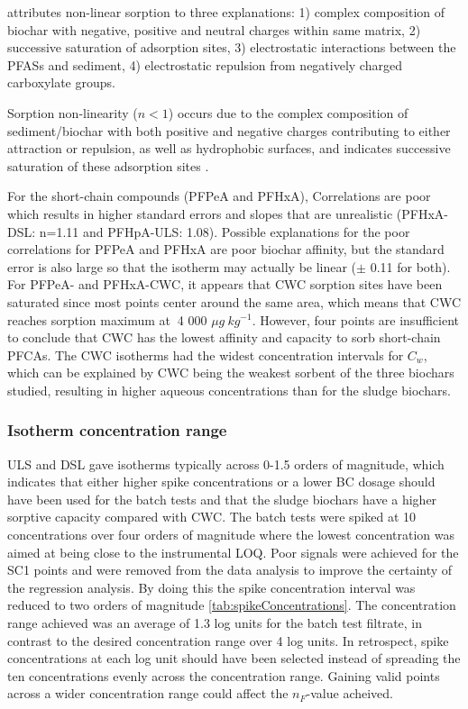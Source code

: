 \citep{yin2022insights} attributes non-linear sorption to three explanations: 1) complex composition of biochar with negative, positive and neutral charges within same matrix, 2) successive saturation of adsorption sites, 3) electrostatic interactions between the PFASs and sediment, 4) electrostatic repulsion from negatively charged carboxylate groups. 

Sorption non-linearity ($n<1$) occurs due to the complex composition of sediment/biochar with both positive and negative charges contributing to either attraction or repulsion, as well as hydrophobic surfaces, and indicates successive saturation of these adsorption sites \citep{yin2022insights}.  

For the short-chain compounds (PFPeA and PFHxA), Correlations are poor which results in higher standard errors and slopes that are unrealistic (PFHxA-DSL: n=1.11 and PFHpA-ULS: 1.08). Possible explanations for the poor correlations for PFPeA and PFHxA are poor biochar affinity, but the standard error is also large so that the isotherm may actually be linear ($\pm$ 0.11 for both). For PFPeA- and PFHxA-CWC, it appears that CWC sorption sites have been saturated since most points center around the same area, which means that CWC reaches sorption maximum at $~$4 000 $\mu g~kg^{-1}$. However, four points are insufficient to conclude that CWC has the lowest affinity and capacity to sorb short-chain PFCAs. The CWC isotherms had the widest concentration intervals for $C_w$, which can be explained by CWC being the weakest sorbent of the three biochars studied, resulting in higher aqueous concentrations than for the sludge biochars. 

\subsubsection{Isotherm concentration range}
ULS and DSL gave isotherms typically across 0-1.5 orders of magnitude, which indicates that either higher spike concentrations or a lower BC dosage should have been used for the batch tests and that the sludge biochars have a higher sorptive capacity compared with CWC. The batch tests were spiked at 10 concentrations over four orders of magnitude where the lowest concentration was aimed at being close to the instrumental LOQ. Poor signals were achieved for the SC1 points and were removed from the data analysis to improve the certainty of the regression analysis. By doing this the spike concentration interval was reduced to two orders of magnitude \cref{tab:spikeConcentrations}. The concentration range achieved was an average of 1.3 log units for the batch test filtrate, in contrast to the desired concentration range over 4 log units. In retrospect, spike concentrations at each log unit should have been selected instead of spreading the ten concentrations evenly across the concentration range. Gaining valid points across a wider concentration range could affect the $n_F$-value acheived. 

